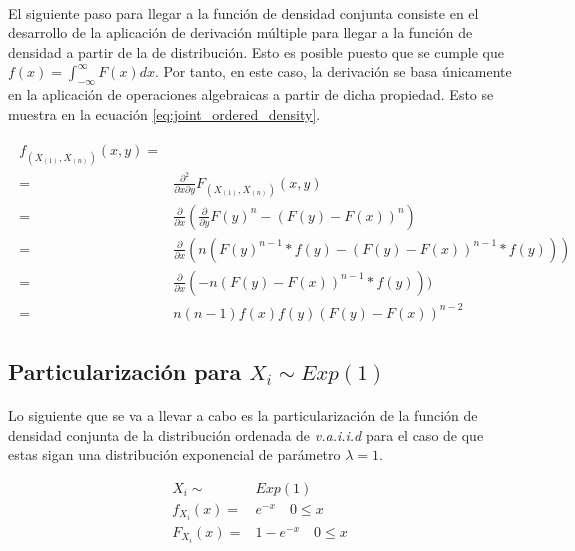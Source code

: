 \documentclass{article}
\begin{document}
    \paragraph{}
    El siguiente paso para llegar a la función de densidad conjunta consiste en el desarrollo de la aplicación de derivación múltiple para llegar a la función de densidad a partir de la de distribución. Esto es posible puesto que se cumple que $f(x)= \int_{-\infty}^{\infty} F(x) dx$. Por tanto, en este caso, la derivación se basa únicamente en la aplicación de operaciones algebraicas a partir de dicha propiedad. Esto se muestra en la ecuación \ref{eq:joint_ordered_density}.

    \begin{align}
      \label{eq:joint_ordered_density}
      \begin{split}
        f_{(X_{(1)}, X_{(n)})} (x,y) =& \\
        =& \frac{\partial^2}{\partial x \partial y}F_{(X_{(1)}, X_{(n)})} (x,y) \\
        =& \frac{\partial}{\partial x}( \frac{\partial}{\partial y} F(y)^n - (F(y)-F(x))^n) \\
        =& \frac{\partial}{\partial x}( n (F(y)^{n-1}*f(y) - (F(y)-F(x))^{n-1}*f(y))) \\
        =& \frac{\partial}{\partial x}( -n (F(y)-F(x))^{n-1}*f(y))) \\
        =& n(n-1)f(x)f(y)(F(y) - F(x))^{n-2}
      \end{split}
    \end{align}

    \subsection{Particularización para $X_i \sim Exp(1)$}

      \paragraph{}
      Lo siguiente que se va a llevar a cabo es la particularización de la función de densidad conjunta de la distribución ordenada de \emph{v.a.i.i.d} para el caso de que estas sigan una distribución exponencial de parámetro $\lambda = 1$.

      \begin{align*}
        X_i \sim& Exp(1)\\
        f_{X_{i}}(x) =& e^{-x}  \quad 0 \leq x \\
        F_{X_{i}}(x) =& 1-e^{-x}  \quad 0 \leq x \\
      \end{align*}
\end{document}
